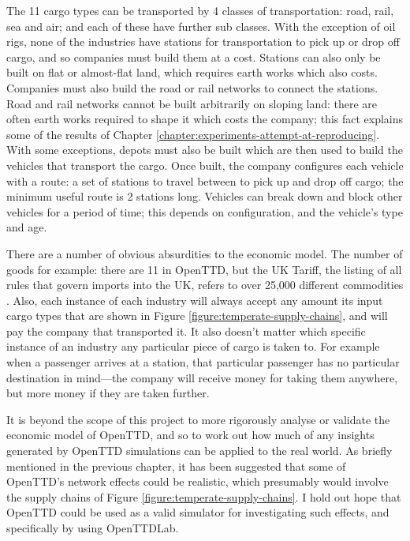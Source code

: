 \documentclass[logo,msc,dsti]{style/infthesis}    %
\begin{document}
{The 11 cargo types can be transported by 4 classes of transportation: road, rail, sea and air; and each of these have further sub classes. With the exception of oil rigs, none of the industries have stations for transportation to pick up or drop off cargo, and so companies must build them at a cost. Stations can also only be built on flat or almost-flat land, which requires earth works which also costs. Companies must also build the road or rail networks to connect the stations. Road and rail networks cannot be built arbitrarily on sloping land: there are often earth works required to shape it which costs the company; this fact explains some of the results of Chapter \ref{chapter:experiments-attempt-at-reproducing}. With some exceptions, depots must also be built which are then used to build the vehicles that transport the cargo. Once built, the company configures each vehicle with a route: a set of stations to travel between to pick up and drop off cargo; the minimum useful route is 2 stations long. Vehicles can break down and block other vehicles for a period of time; this depends on configuration, and the vehicle's type and age.

There are a number of obvious absurdities to the economic model. The number of goods for example: there are 11 in OpenTTD, but the UK Tariff, the listing of all rules that govern imports into the UK, refers to over 25,000 different commodities \cite{uktariff}. Also, each instance of each industry will always accept any amount its input cargo types that are shown in Figure \ref{figure:temperate-supply-chains}, and will pay the company that transported it. It also doesn't matter which specific instance of an industry any particular piece of cargo is taken to. For example when a passenger arrives at a station, that particular passenger has no particular destination in mind---the company will receive money for taking them anywhere, but more money if they are taken further.

It is beyond the scope of this project to more rigorously analyse or validate the economic model of OpenTTD, and so to work out how much of any insights generated by OpenTTD simulations can be applied to the real world. As briefly mentioned in the previous chapter, it has been suggested that some of OpenTTD's network effects could be realistic, which presumably would involve the supply chains of Figure \ref{figure:temperate-supply-chains}. I hold out hope that OpenTTD could be used as a valid simulator for investigating such effects, and specifically by using OpenTTDLab.

}
\end{document}
